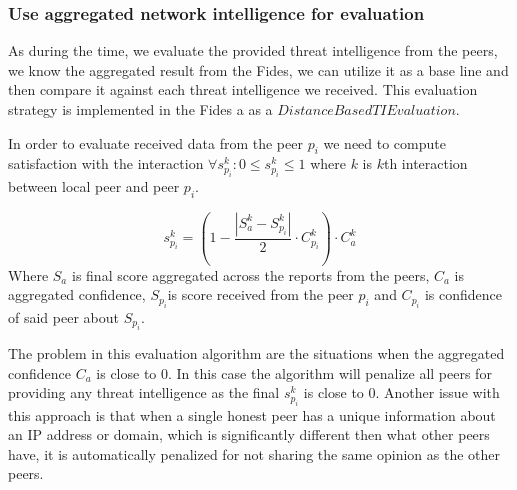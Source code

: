 \subsubsection{Use aggregated network intelligence for evaluation}
As during the time, we evaluate the provided threat intelligence from the peers, we know the aggregated result from the Fides, we can utilize it as a base line and then compare it against each threat intelligence we received. This evaluation strategy is implemented in the Fides a as a $DistanceBasedTIEvaluation$.


In order to evaluate received data from the peer $p_i$ we need to compute satisfaction with the interaction  $\forall s^{k}_{p_i}: 0 \leq s^{k}_{p_i} \leq 1$ where $k$ is $k$th interaction  between local peer and peer $p_i$.

\begin{equation}
s^{k}_{p_i} = (1 - \frac{|S^{k}_{a} - S^{k}_{p_i}|}{2} \cdot C^{k}_{p_i}) \cdot C^{k}_a
\end{equation}
Where $S_a$ is final score aggregated across the reports from the peers, $C_a$ is aggregated confidence, $S_{p_i}$is score received from the peer $p_i$ and $C_{p_i}$ is confidence of said peer about $S_{p_i}$. 

The problem in this evaluation algorithm are the situations when the aggregated confidence $C_a$ is close to $0$. In this case the algorithm will penalize all peers for providing any threat intelligence as the final $s^{k}_{p_i}$ is close to $0$. Another issue with this approach is that when a single honest peer has a unique information about an IP address or domain, which is significantly different then what other peers have, it is automatically penalized for not sharing the same opinion as the other peers. 

